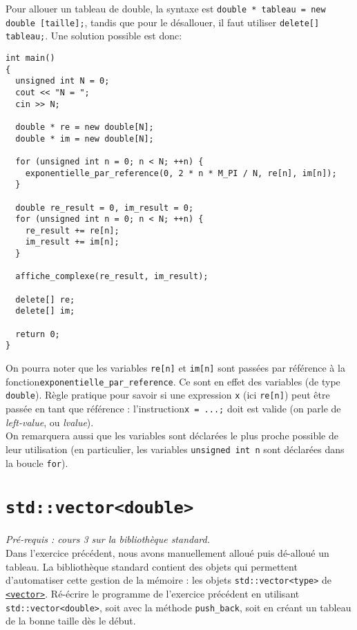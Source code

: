 \documentclass{book}
\newcommand{\inline}[1]{\texttt{#1}}
\begin{document}
\begin{correction}
Pour allouer un tableau de double, la syntaxe est \inline{double * tableau = new double [taille];}, tandis que pour le désallouer, il faut utiliser 
\inline{delete[] tableau;}. Une solution possible est donc:
\begin{verbatim}
int main() 
{
  unsigned int N = 0;
  cout << "N = ";
  cin >> N;

  double * re = new double[N];
  double * im = new double[N];

  for (unsigned int n = 0; n < N; ++n) {
    exponentielle_par_reference(0, 2 * n * M_PI / N, re[n], im[n]);
  }

  double re_result = 0, im_result = 0;
  for (unsigned int n = 0; n < N; ++n) {
    re_result += re[n];
    im_result += im[n];
  }

  affiche_complexe(re_result, im_result);

  delete[] re;
  delete[] im;

  return 0;
}
\end{verbatim}

On pourra noter que les variables \inline{re[n]} et \inline{im[n]} sont passées par référence à la fonction\linebreak \inline{exponentielle_par_reference}. Ce sont en effet des variables (de type \inline{double}). Règle pratique pour savoir si une expression \inline{x} (ici \inline{re[n]}) peut être passée en tant que référence : l'instruction\linebreak \inline{x = ...;} doit est valide (on parle de \textit{left-value}, ou \textit{lvalue}).\\

On remarquera aussi que les variables sont déclarées le plus proche possible de leur utilisation (en particulier, les variables \inline{unsigned int n} sont déclarées dans la boucle \inline{for}). 
\end{correction}


\section{\texttt{std::vector<double>}}

\emph{Pré-requis : cours 3 sur la bibliothèque standard.}\\

Dans l'exercice précédent, nous avons manuellement alloué puis dé-alloué un tableau. La bibliothèque standard contient des objets qui permettent d'automatiser cette gestion de la mémoire : les objets \inline{std::vector<type>} de \href{http://en.cppreference.com/w/cpp/header/vector}{\inline{<vector>}}. Ré-écrire le programme de l'exercice précédent en utilisant \inline{std::vector<double>}, soit avec la méthode \texttt{push\_back}, soit en créant un tableau de la bonne taille dès le début.\\
\end{document}
